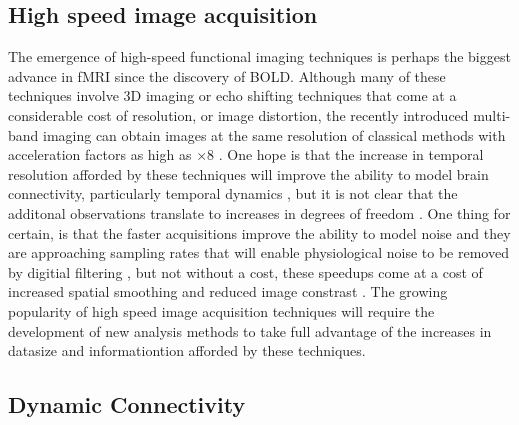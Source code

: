 \subsection{High speed image acquisition}

The emergence of high-speed functional imaging techniques is perhaps the biggest advance in fMRI since the discovery of BOLD. Although many of these techniques involve 3D imaging \cite{glover, MRNguy} or echo shifting techniques \cite{PRESTO} that come at a considerable cost of resolution, or image distortion, the recently introduced multi-band imaging can obtain images at the same resolution of classical methods with acceleration factors as high as $\times8$ \cite{Feinberg}. One hope is that the increase in temporal resolution afforded by these techniques will improve the ability to model brain connectivity, particularly temporal dynamics \cite{smithTICA}, but it is not clear that the additonal observations translate to increases in degrees of freedom \cite{MRNguy}. One thing for certain, is that the faster acquisitions improve the ability to model noise and they are approaching sampling rates that will enable physiological noise to be removed by digitial filtering \cite{beckmann}, but not without a cost, these speedups come at a cost of increased spatial smoothing and reduced image constrast \cite{needfind}. The growing popularity of high speed image acquisition techniques will require the development of new analysis methods to take full advantage of the increases in datasize and informationtion afforded by these techniques.

\subsection{Dynamic Connectivity}


